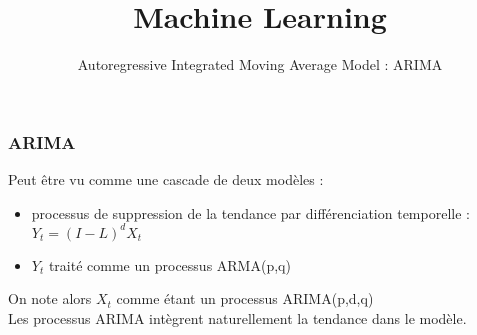 \documentclass{formation}
\title{Machine Learning}
\subtitle{Autoregressive Integrated Moving Average Model : ARIMA}
\begin{document}
\maketitle

\begin{frame}
  \frametitle{ARIMA}
  Peut être vu comme une cascade de deux modèles :
  \begin{itemize}
  \item processus de suppression de la tendance par différenciation temporelle : $Y_t=(I-L)^dX_t$
  \item $Y_t$ traité comme un processus ARMA(p,q)
  \end{itemize}
  On note alors $X_t$ comme étant un processus ARIMA(p,d,q) \\
  Les processus ARIMA intègrent naturellement la tendance dans le modèle.
\end{frame}
\end{document}
